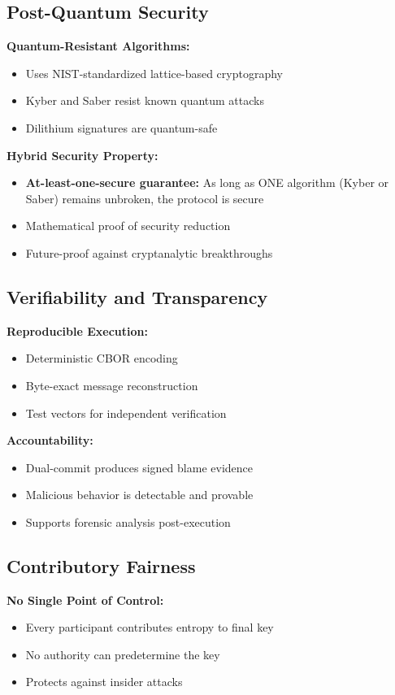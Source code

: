 \documentclass[12pt,a4paper]{report}
\begin{document}
\subsection{Post-Quantum Security}

\textbf{Quantum-Resistant Algorithms:}
\begin{itemize}
\item Uses NIST-standardized lattice-based cryptography
\item Kyber and Saber resist known quantum attacks
\item Dilithium signatures are quantum-safe
\end{itemize}

\textbf{Hybrid Security Property:}
\begin{itemize}
\item \textbf{At-least-one-secure guarantee:} As long as ONE algorithm (Kyber or Saber) remains unbroken, the protocol is secure
\item Mathematical proof of security reduction
\item Future-proof against cryptanalytic breakthroughs
\end{itemize}

\subsection{Verifiability and Transparency}

\textbf{Reproducible Execution:}
\begin{itemize}
\item Deterministic CBOR encoding
\item Byte-exact message reconstruction
\item Test vectors for independent verification
\end{itemize}

\textbf{Accountability:}
\begin{itemize}
\item Dual-commit produces signed blame evidence
\item Malicious behavior is detectable and provable
\item Supports forensic analysis post-execution
\end{itemize}

\subsection{Contributory Fairness}

\textbf{No Single Point of Control:}
\begin{itemize}
\item Every participant contributes entropy to final key
\item No authority can predetermine the key
\item Protects against insider attacks
\end{itemize}
\end{document}
